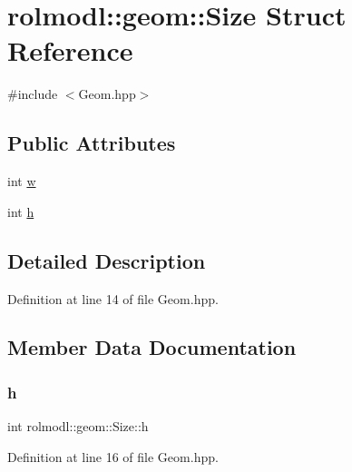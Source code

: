 \hypertarget{structrolmodl_1_1geom_1_1_size}{}\section{rolmodl\+::geom\+::Size Struct Reference}
\label{structrolmodl_1_1geom_1_1_size}


{\ttfamily \#include $<$Geom.\+hpp$>$}

\subsection*{Public Attributes}
\begin{DoxyCompactItemize}
\item 
int \mbox{\hyperlink{structrolmodl_1_1geom_1_1_size_a3d08dfcec73b546e4861450dee00ba5e}{w}}
\item 
int \mbox{\hyperlink{structrolmodl_1_1geom_1_1_size_ae13c3950ceb048bbfb108f85ad369513}{h}}
\end{DoxyCompactItemize}


\subsection{Detailed Description}


Definition at line 14 of file Geom.\+hpp.



\subsection{Member Data Documentation}
\mbox{\label{structrolmodl_1_1geom_1_1_size_ae13c3950ceb048bbfb108f85ad369513}} 
\subsubsection{\texorpdfstring{h}{h}}
{\footnotesize\ttfamily int rolmodl\+::geom\+::\+Size\+::h}



Definition at line 16 of file Geom.\+hpp.

\mbox{\label{structrolmodl_1_1geom_1_1_size_a3d08dfcec73b546e4861450dee00ba5e}} 
